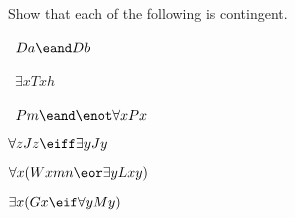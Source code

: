




\practiceproblems


\problempart
\label{pr.Contingent}
Show that each of the following is contingent.
\begin{earg}
\item \leftsolutions\ $Da \eand Db$
\item \leftsolutions\ $\exists x Txh$
\item \leftsolutions\ $Pm \eand \enot\forall x Px$
\item $\forall z Jz \eiff \exists y Jy$
\item $\forall x (Wxmn \eor \exists yLxy)$
\item $\exists x (Gx \eif \forall y My)$
\end{earg}


